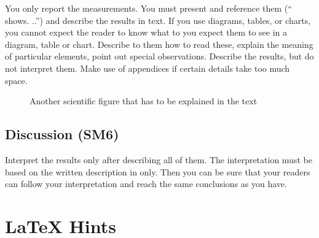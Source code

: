 You only report the measurements.
You must present and reference them (`` shows.
..'') and describe the results in text.
If you use diagrams, tables, or charts, you cannot expect the reader to know what to you expect them to see in a diagram, table or chart.
Describe to them how to read these, explain the meaning of particular elements, point out special observations.
Describe the results, but do not interpret them.
Make use of appendices if certain details take too much space.

\begin{figure}
  \centering
  \caption{Another scientific figure that has to be explained in the text}
  \label{fig:my_label2}
\end{figure}

\section{Discussion (SM6)}\label{sec:evaluation:discussion}

Interpret the results only after describing all of them.
The interpretation must be based on the written description in  only.
Then you can be sure that your readers can follow your interpretation and reach the same conclusions as you have.


\chapter{LaTeX Hints}
\label{sec:latexhints}

\newcount\LTGbeginlineexample
\newcount\LTGendlineexample
\newenvironment{ltgexample}%
{\LTGbeginlineexample=\numexpr\inputlineno+1\relax}%
{\LTGendlineexample=\numexpr\inputlineno-1\relax%
  \tcbinputlisting{%
    listing only,
    listing file=\currfilepath,
    colback=green!5!white,
    colframe=green!25,
    coltitle=black!90,
    coltext=black!90,
    left=8mm,
    title=Corresponding \LaTeX{} code of \texttt{\currfilepath},
    minted language=TeX,
    minted style=vs,
    minted options={
        fontsize=\footnotesize,
        firstline=\the\LTGbeginlineexample,
        lastline=\the\LTGendlineexample,
        firstnumber=\the\LTGbeginlineexample,
        breaklines,
        linenos,
        numbersep=8pt
      }
  }
}%

